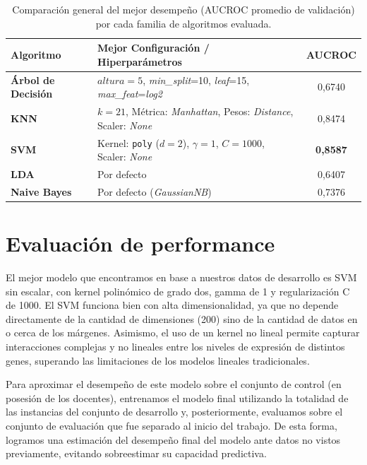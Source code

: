 \documentclass[10pt,a4paper]{article}
\begin{document}
\begin{table}[H]
\centering
\small
\setlength{\tabcolsep}{10pt}
\renewcommand{\arraystretch}{1.2}

\begin{tabular}{llc}
\toprule
\textbf{Algoritmo} & \textbf{Mejor Configuración / Hiperparámetros} & \textbf{AUCROC} \\
\midrule
\textbf{Árbol de Decisión} &  $altura=5$, \textit{min\_split}=10, \textit{leaf}=15, \textit{max\_feat}=\textit{log2} & 0,6740 \\
\textbf{KNN} & $k=21$, Métrica: \textit{Manhattan}, Pesos: \textit{Distance}, Scaler: \textit{None} & 0,8474 \\
\textbf{SVM} & Kernel: \texttt{poly} ($d=2$), $\gamma=1$, $C=1000$, Scaler: \textit{None} & \textbf{0,8587} \\
\textbf{LDA} & Por defecto & 0,6407 \\
\textbf{Naive Bayes} & Por defecto (\textit{GaussianNB}) & 0,7376 \\
\bottomrule
\end{tabular}

\caption{Comparación general del mejor desempeño (AUCROC promedio de validación) por cada familia de algoritmos evaluada.}
\label{tab:comparacion_algoritmos_resumen}
\end{table}

\section{Evaluación de performance}
El mejor modelo que encontramos en base a nuestros datos de desarrollo es SVM sin escalar, con kernel polinómico de grado dos, gamma de 1 y regularización C de 1000. El SVM funciona bien con alta dimensionalidad, ya que no depende directamente de la cantidad de dimensiones (200) sino de la cantidad de datos en o cerca de los márgenes. Asimismo, el uso de un kernel no lineal permite capturar interacciones complejas y no lineales entre los niveles de expresión de distintos genes, superando las limitaciones de los modelos lineales tradicionales.

Para aproximar el desempeño de este modelo sobre el conjunto de control (en posesión de los docentes), entrenamos el modelo final utilizando la totalidad de las instancias del conjunto de desarrollo y, posteriormente, evaluamos sobre el conjunto de evaluación que fue separado al inicio del trabajo. De esta forma, logramos una estimación del desempeño final del modelo ante datos no vistos previamente, evitando sobreestimar su capacidad predictiva.
\end{document}
